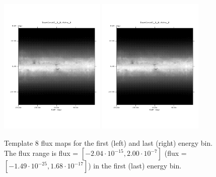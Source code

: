 \documentclass{article}
\begin{document}
\begin{figure}
\centering
\includegraphics[trim = 50 100 70 100, clip = true, width=0.45\textwidth]{figs/Template_maps/Template8_Ebin01}
\includegraphics[trim = 50 100 70 100, clip = true, width=0.45\textwidth]{figs/Template_maps/Template8_Ebin71}
\caption{Template 8 flux maps for the first (left) and last (right) energy bin. The flux range is flux = $[-2.04 \cdot 10^{-15}, 2.00 \cdot 10^{-7}]$ (flux = $[-1.49 \cdot 10^{-25}, 1.68 \cdot 10^{-17}]$) in the first (last) energy bin.}
\end{figure}
\end{document}
